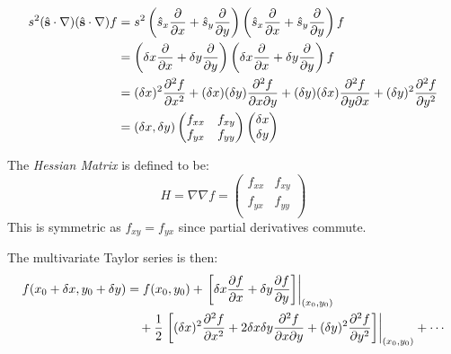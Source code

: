 \documentclass[../main.tex]{subfiles}
\begin{document}
\begin{align*}
  s^2(\uvec{s} \cdot \nabla)(\uvec{s} \cdot \nabla)f &= s^2\left(\hat{s}_x \pderiv{}{x} + \hat{s}_y \pderiv{}{y}\right)\left(\hat{s}_x \pderiv{}{x} + \hat{s}_y \pderiv{}{y}\right)f \\
                                                      &= \left(\delta x \pderiv{}{x} + \delta y \pderiv{}{y}\right)\left(\delta x \pderiv{}{x} + \delta y \pderiv{}{y}\right)f \\
                                                      &= (\delta x)^2 \pderiv[2]{f}{x} + (\delta x)(\delta y) \frac{\partial^2 f}{\partial x \partial y} + (\delta y)(\delta x)\frac{\partial^2 f}{\partial y \partial x} + (\delta y)^2 \pderiv[2]{f}{y} \\
                                                      &= (\delta x, \delta y)
                                                      \begin{pmatrix}
                                                      f_{x x} & f_{x y} \\
                                                      f_{y x} & f_{y y} \\
                                                      \end{pmatrix}
                                                      \begin{pmatrix}
                                                      \delta x \\
                                                      \delta y \\
                                                      \end{pmatrix}
\end{align*}
\begin{definition}
  The \textit{Hessian Matrix} is defined to be:
  \[
    H = \nabla \nabla f = \begin{pmatrix}
    f_{x x} & f_{x y} \\
    f_{y x} & f_{y y} \\
    \end{pmatrix}
  \]
  This is symmetric as $f_{x y} = f_{y x}$ since partial derivatives commute.
\end{definition}
The multivariate Taylor series is then:
\begin{align*}
  f(x_0 + \delta x, y_0 + \delta y) &= f(x_0, y_0) + \at{\left[\delta x \pderiv{f}{x} + \delta y \pderiv{f}{y}\right]}{(x_0, y_0)} \\ &\quad+\frac{1}{2}\at{\left[(\delta x)^2 \pderiv[2]{f}{x} + 2\delta x\delta y \frac{\partial^2 f}{\partial x \partial y} + (\delta y)^2 \pderiv[2]{f}{y}\right]}{(x_0, y_0)} + \cdots
\end{align*}
\end{document}
